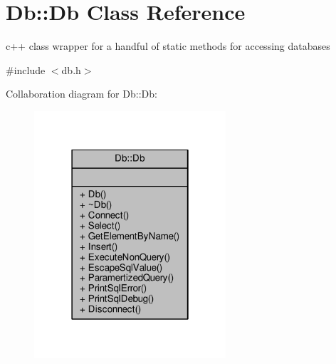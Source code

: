 \hypertarget{classDb_1_1Db}{\section{Db\-:\-:Db Class Reference}
\label{classDb_1_1Db}
}


c++ class wrapper for a handful of static methods for accessing databases  




{\ttfamily \#include $<$db.\-h$>$}



Collaboration diagram for Db\-:\-:Db\-:
\nopagebreak
\begin{figure}[H]
\begin{center}
\leavevmode
\includegraphics[width=202pt]{classDb_1_1Db__coll__graph}
\end{center}
\end{figure}
